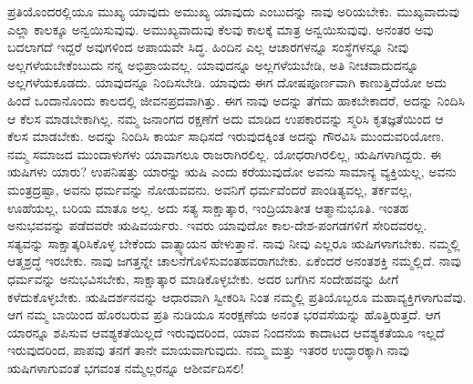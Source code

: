 ಪ್ರತಿಯೊಂದರಲ್ಲಿಯೂ ಮುಖ್ಯ ಯಾವುದು ಅಮುಖ್ಯ ಯಾವುದು ಎಂಬುದನ್ನು ನಾವು ಅರಿಯಬೇಕು. ಮುಖ್ಯವಾದುವು ಎಲ್ಲಾ ಕಾಲಕ್ಕೂ ಅನ್ವಯಿಸುವುವು. ಅಮುಖ್ಯವಾದುವು ಕೆಲವು ಕಾಲಕ್ಕೆ ಮಾತ್ರ ಅನ್ವಯಿಸುವುವು. ಅನಂತರ ಅವು ಬದಲಾಗದೆ ಇದ್ದರೆ ಅವುಗಳಿಂದ ಅಪಾಯವೇ ಸಿದ್ಧ. ಹಿಂದಿನ ಎಲ್ಲ ಆಚಾರಗಳನ್ನೂ ಸಂಸ್ಥೆಗಳನ್ನೂ ನೀವು ಅಲ್ಲಗಳೆಯಬೇಕೆಂಬುದು ನನ್ನ ಅಭಿಪ್ರಾಯವಲ್ಲ. ಯಾವುದನ್ನೂ ಅಲ್ಲಗಳೆಯಬೇಡಿ, ಅತಿ ನೀಚವಾದುದನ್ನೂ ಅಲ್ಲಗಳೆಯಕೂಡದು. ಯಾವುದನ್ನೂ ನಿಂದಿಸಬೇಡಿ. ಯಾವುದು ಈಗ ದೋಷಪೂರ್ಣವಾಗಿ ಕಾಣುತ್ತಿದೆಯೋ ಅದು ಹಿಂದೆ ಒಂದಾನೊಂದು ಕಾಲದಲ್ಲಿ ಜೀವನಪ್ರದವಾಗಿತ್ತು. ಈಗ ನಾವು ಅದನ್ನು ತೆಗೆದು ಹಾಕಬೇಕಾದರೆ, ಅದನ್ನು ನಿಂದಿಸಿ ಆ ಕೆಲಸ ಮಾಡಬೇಕಾಗಿಲ್ಲ. ನಮ್ಮ ಜನಾಂಗದ ರಕ್ಷಣೆಗೆ ಅದು ಮಾಡಿದ ಉಪಕಾರವನ್ನು ಸ್ಮರಿಸಿ ಕೃತಜ್ಞತೆಯಿಂದ ಆ ಕೆಲಸ ಮಾಡಬೇಕು. ಅದನ್ನು ನಿಂದಿಸಿ ಕಾರ್ಯ ಸಾಧಿಸದೆ ಇರುವುದಕ್ಕಿಂತ ಅದನ್ನು ಗೌರವಿಸಿ ಮುಂದುವರಿಯೋಣ. ನಮ್ಮ ಸಮಾಜದ ಮುಂದಾಳುಗಳು ಯಾವಾಗಲೂ ರಾಜರಾಗಿರಲಿಲ್ಲ. ಯೋಧರಾಗಿರಲಿಲ್ಲ, ಋಷಿಗಳಾಗಿದ್ದರು. ಈ ಋಷಿಗಳು ಯಾರು? ಉಪನಿಷತ್ತು ಯಾರನ್ನು ಋಷಿ ಎಂದು ಕರೆಯುವುದೋ ಅವನು ಸಾಮಾನ್ಯ ವ್ಯಕ್ತಿಯಲ್ಲ, ಅವನು ಮಂತ್ರದ್ರಷ್ಟಾ, ಅವನು ಧರ್ಮವನ್ನು ನೋಡುವವನು. ಅವನಿಗೆ ಧರ್ಮವೆಂದರೆ ಪಾಂಡಿತ್ಯವಲ್ಲ, ತರ್ಕವಲ್ಲ, ಊಹೆಯಲ್ಲ, ಬರಿಯ ಮಾತೂ ಅಲ್ಲ. ಅದು ಸತ್ಯ ಸಾಕ್ಷಾತ್ಕಾರ, ಇಂದ್ರಿಯಾತೀತ ಆತ್ಮಾನುಭೂತಿ. ಇಂತಹ ಅನುಭವವನ್ನು ಪಡೆದವರೇ ಋಷಿವರ್ಯರು. ಇವರು ಯಾವುದೋ ಕಾಲ-ದೇಶ-ಪಂಗಡಗಳಿಗೆ ಸೇರಿದವರಲ್ಲ. ಸತ್ಯವನ್ನು ಸಾಕ್ಷಾತ್ಕರಿಸಿಕೊಳ್ಳ ಬೇಕೆಂದು ವಾತ್ಸ್ಯಾಯನ ಹೇಳುತ್ತಾನೆ. ನಾವು ನೀವು ಎಲ್ಲರೂ ಋಷಿಗಳಾಗಬೇಕು. ನಮ್ಮಲ್ಲಿ ಆತ್ಮಶ್ರದ್ಧೆ ಇರಬೇಕು. ನಾವು ಜಗತ್ತನ್ನೇ ಚಾಲನೆಗೊಳಿಸುವಂತಹವರಾಗಬೇಕು. ಏಕೆಂದರೆ ಅನಂತಶಕ್ತಿ ನಮ್ಮಲ್ಲಿದೆ. ನಾವು ಧರ್ಮವನ್ನು ಅನುಭವಿಸಬೇಕು, ಸಾಕ್ಷಾತ್ಕಾರ ಮಾಡಿಕೊಳ್ಳಬೇಕು. ಅದರ ಬಗೆಗಿನ ಸಂದೇಹವನ್ನು ಹೀಗೆ ಕಳೆದುಕೊಳ್ಳಬೇಕು. ಋಷಿದರ್ಶನವನ್ನು ಆಧಾರವಾಗಿ ಸ್ವೀಕರಿಸಿ ನಿಂತ ನಮ್ಮಲ್ಲಿ ಪ್ರತಿಯೊಬ್ಬರೂ ಮಹಾವ್ಯಕ್ತಿಗಳಾಗುವೆವು. ಆಗ ನಮ್ಮ ಬಾಯಿಂದ ಹೊರಬರುವ ಪ್ರತಿ ನುಡಿಯೂ ಸಂರಕ್ಷಣೆಯ ಅನಂತ ಭರವಸೆಯನ್ನು ಹೊತ್ತಿರುತ್ತದೆ. ಆಗ ಯಾರನ್ನೂ ಶಪಿಸುವ ಆವಶ್ಯಕತೆಯಿಲ್ಲದೆ ಇರುವುದರಿಂದ, ಯಾವ ನಿಂದನೆಯ ಕಾದಾಟದ ಆವಶ್ಯಕತೆಯೂ ಇಲ್ಲದೆ ಇರುವುದರಿಂದ, ಪಾಪವು ತನಗೆ ತಾನೇ ಮಾಯವಾಗುವುದು. ನಮ್ಮ ಮತ್ತು ಇತರರ ಉದ್ಧಾರಕ್ಕಾಗಿ ನಾವು ಋಷಿಗಳಾಗುವಂತೆ ಭಗವಂತ ನಮ್ಮೆಲ್ಲರನ್ನೂ ಆಶೀರ್ವದಿಸಲಿ!

